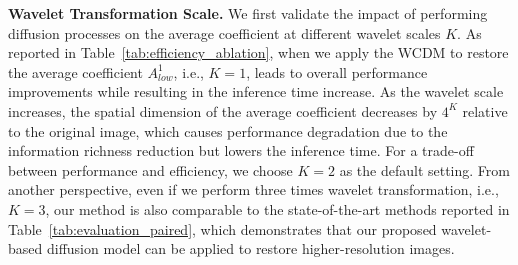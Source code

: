 \textbf{Wavelet Transformation Scale.} We first validate the impact of performing diffusion processes on the average coefficient at different wavelet scales $K$. As reported in Table~\ref{tab:efficiency_ablation}, when we apply the WCDM to restore the average coefficient $A_{low}^{1}$, i.e., $K=1$, leads to overall performance improvements while resulting in the inference time increase. As the wavelet scale increases, the spatial dimension of the average coefficient decreases by $4^{K}$ relative to the original image, which causes performance degradation due to the information richness reduction but lowers the inference time. For a trade-off between performance and efficiency, we choose $K=2$ as the default setting. From another perspective, even if we perform three times wavelet transformation, i.e., $K=3$, our method is also comparable to the state-of-the-art methods reported in Table~\ref{tab:evaluation_paired}, which demonstrates that our proposed wavelet-based diffusion model can be applied to restore higher-resolution images.
\begin{table}[!t]
	\centering
	\caption{Ablation studies of various settings on the wavelet transformation scale and sampling step, please refer to the text for more details. The results using default settings are \underline{underlined}.}
	\label{tab:efficiency_ablation}
\end{table}


